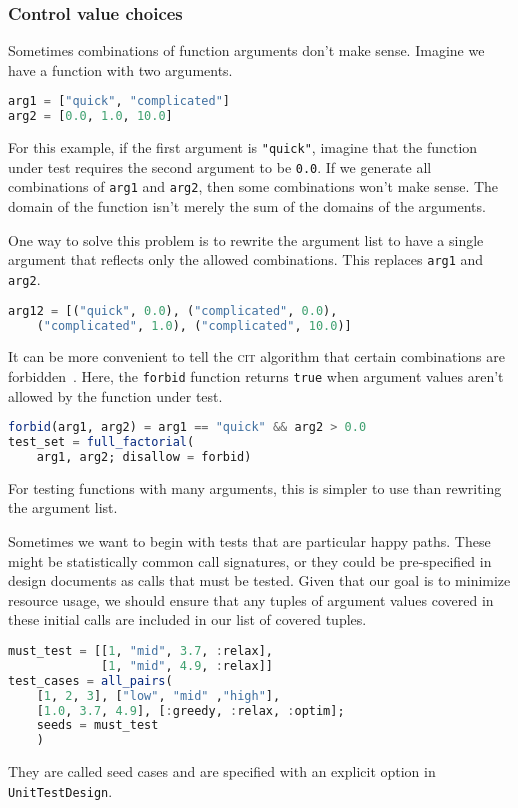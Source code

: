 \documentclass{juliacon}
\newcommand{\utd}{\texttt{UnitTestDesign}\xspace}
\newcommand{\cit}{\textsc{cit}\xspace}
\begin{document}
\subsubsection{Control value choices}

Sometimes combinations of function arguments don't make sense. Imagine we have a function with two arguments.
\begin{lstlisting}[language=Julia]
arg1 = ["quick", "complicated"]
arg2 = [0.0, 1.0, 10.0]
\end{lstlisting}
For this example, if the first argument is \verb|"quick"|, imagine that the function under test requires the second argument to be \verb|0.0|. If we generate all combinations of \verb|arg1| and \verb|arg2|, then some combinations won't make sense. The domain of the function isn't merely the sum of the domains of the arguments.

\vskip 6pt
One way to solve this problem is to rewrite the argument list to have a single argument that reflects only the allowed combinations. This replaces \verb|arg1| and \verb|arg2|.
\begin{lstlisting}[language=Julia]
arg12 = [("quick", 0.0), ("complicated", 0.0),
    ("complicated", 1.0), ("complicated", 10.0)]
\end{lstlisting}
It can be more convenient to tell the \cit algorithm that certain combinations are forbidden~\cite{Petke2015-ex,Grindal2006-vy}. Here, the \verb|forbid| function returns \verb|true| when argument values aren't allowed by the function under test.
\begin{lstlisting}[language=Julia]
forbid(arg1, arg2) = arg1 == "quick" && arg2 > 0.0
test_set = full_factorial(
    arg1, arg2; disallow = forbid)
\end{lstlisting}
For testing functions with many arguments, this is simpler to use than rewriting the argument list.

\vskip 6pt
Sometimes we want to begin with tests that are particular happy paths. These might be statistically common call signatures, or they could be pre-specified in design documents as calls that must be tested. Given that our goal is to minimize resource usage, we should ensure that any tuples of argument values covered in these initial calls are included in our list of covered tuples.
\begin{lstlisting}[language=Julia]
must_test = [[1, "mid", 3.7, :relax],
             [1, "mid", 4.9, :relax]]
test_cases = all_pairs(
    [1, 2, 3], ["low", "mid" ,"high"],
    [1.0, 3.7, 4.9], [:greedy, :relax, :optim];
    seeds = must_test
    )
\end{lstlisting}
They are called seed cases and are specified with an explicit option in \utd.
\end{document}
